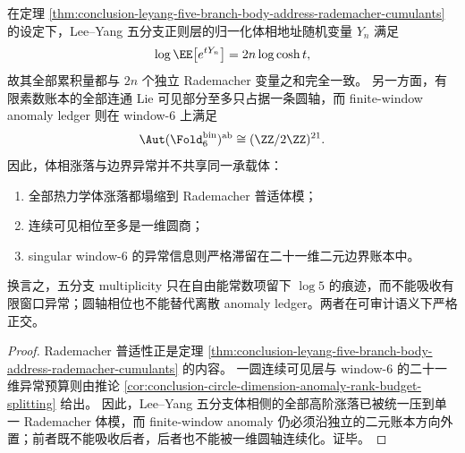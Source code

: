 \begin{theorem}\label{thm:conclusion-leyang-rademacher-circle-anomaly-orthogonal-ledgers}
在定理 \ref{thm:conclusion-leyang-five-branch-body-address-rademacher-cumulants} 的设定下，Lee--Yang 五分支正则层的归一化体相地址随机变量 \(Y_n\) 满足
\[
\log \EE\!\left[e^{tY_n}\right]=2n\log\cosh t,
\]
故其全部累积量都与 \(2n\) 个独立 Rademacher 变量之和完全一致。
另一方面，有限素数账本的全部连通 Lie 可见部分至多只占据一条圆轴，而 finite-window anomaly ledger 则在 window-\(6\) 上满足
\[
\Aut(\Fold_6^{\mathrm{bin}})^{\mathrm{ab}}\cong (\ZZ/2\ZZ)^{21}.
\]
因此，体相涨落与边界异常并不共享同一承载体：
\begin{enumerate}
  \item 全部热力学体涨落都塌缩到 Rademacher 普适体模；
  \item 连续可见相位至多是一维圆商；
  \item singular window-\(6\) 的异常信息则严格滞留在二十一维二元边界账本中。
\end{enumerate}
换言之，五分支 multiplicity 只在自由能常数项留下 \(\log 5\) 的痕迹，而不能吸收有限窗口异常；圆轴相位也不能替代离散 anomaly ledger。两者在可审计语义下严格正交。
\end{theorem}

\begin{proof}
Rademacher 普适性正是定理 \ref{thm:conclusion-leyang-five-branch-body-address-rademacher-cumulants} 的内容。
一圆连续可见层与 window-\(6\) 的二十一维异常预算则由推论 \ref{cor:conclusion-circle-dimension-anomaly-rank-budget-splitting} 给出。
因此，Lee--Yang 五分支体相侧的全部高阶涨落已被统一压到单一 Rademacher 体模，而 finite-window anomaly 仍必须沿独立的二元账本方向外置；前者既不能吸收后者，后者也不能被一维圆轴连续化。证毕。
\end{proof}
